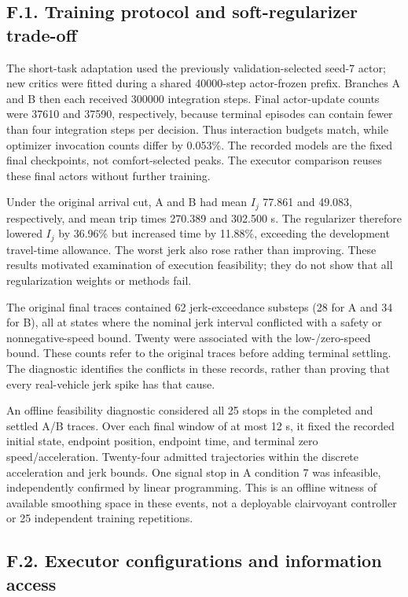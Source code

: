 \documentclass[letterpaper,journal,onecolumn]{IEEEtran}
\begin{document}
\subsection*{F.1. Training protocol and soft-regularizer trade-off}

The short-task adaptation used the previously validation-selected seed-7 actor; new critics were fitted during a shared 40000-step actor-frozen prefix. Branches A and B then each received 300000 integration steps. Final actor-update counts were 37610 and 37590, respectively, because terminal episodes can contain fewer than four integration steps per decision. Thus interaction budgets match, while optimizer invocation counts differ by 0.053\%. The recorded models are the fixed final checkpoints, not comfort-selected peaks. The executor comparison reuses these final actors without further training.

Under the original arrival cut, A and B had mean \(I_j\) 77.861 and 49.083, respectively, and mean trip times 270.389 and 302.500 s. The regularizer therefore lowered \(I_j\) by 36.96\% but increased time by 11.88\%, exceeding the development travel-time allowance. The worst jerk also rose rather than improving. These results motivated examination of execution feasibility; they do not show that all regularization weights or methods fail.

The original final traces contained 62 jerk-exceedance substeps (28 for A and 34 for B), all at states where the nominal jerk interval conflicted with a safety or nonnegative-speed bound. Twenty were associated with the low-/zero-speed bound. These counts refer to the original traces before adding terminal settling. The diagnostic identifies the conflicts in these records, rather than proving that every real-vehicle jerk spike has that cause.

An offline feasibility diagnostic considered all 25 stops in the completed and settled A/B traces. Over each final window of at most 12 s, it fixed the recorded initial state, endpoint position, endpoint time, and terminal zero speed/acceleration. Twenty-four admitted trajectories within the discrete acceleration and jerk bounds. One signal stop in A condition 7 was infeasible, independently confirmed by linear programming. This is an offline witness of available smoothing space in these events, not a deployable clairvoyant controller or 25 independent training repetitions.

\subsection*{F.2. Executor configurations and information access}
\end{document}
